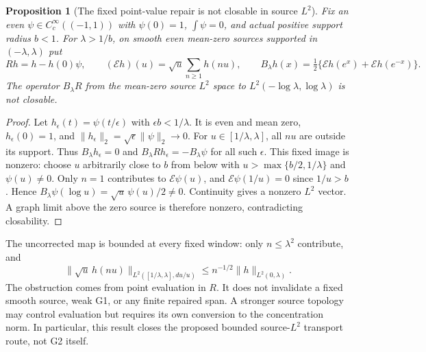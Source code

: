 \documentclass[11pt]{article}
\newtheorem{proposition}[theorem]{Proposition}
\theoremstyle{remark}
\begin{document}
\begin{proposition}[The fixed point-value repair is not closable in source $L^2$]
\label{prop:v127-nonclosable}
Fix an even $\psi\in C_c^\infty((-1,1))$ with $\psi(0)=1$,
$\int\psi=0$, and actual positive support radius $b<1$.
For $\lambda>1/b$, on smooth even mean-zero sources supported in
$(-\lambda,\lambda)$ put
\[
 Rh=h-h(0)\psi,\qquad
 (\mathcal Eh)(u)=\sqrt u\sum_{n\ge1}h(nu),\qquad
 B_\lambda h(x)=\tfrac12\{\mathcal Eh(e^x)+\mathcal Eh(e^{-x})\}.
\]
The operator $B_\lambda R$ from the mean-zero source $L^2$ space
to $L^2(-\log\lambda,\log\lambda)$ is not closable.
\end{proposition}
\begin{proof}
Let $h_\epsilon(t)=\psi(t/\epsilon)$ with $\epsilon b<1/\lambda$.
It is even and mean zero, $h_\epsilon(0)=1$, and
$\|h_\epsilon\|_2=\sqrt\epsilon\|\psi\|_2\to0$.
For $u\in[1/\lambda,\lambda]$, all $nu$ are outside its support.
Thus $B_\lambda h_\epsilon=0$ and
$B_\lambda R h_\epsilon=-B_\lambda\psi$ for all such $\epsilon$.
This fixed image is nonzero: choose $u$ arbitrarily close to $b$
from below with $u>\max\{b/2,1/\lambda\}$ and $\psi(u)\ne0$.
Only $n=1$ contributes to $\mathcal E\psi(u)$, and
$\mathcal E\psi(1/u)=0$ since $1/u>b$. Hence
$B_\lambda\psi(\log u)=\sqrt u\,\psi(u)/2\ne0$.
Continuity gives a nonzero $L^2$ vector. A graph limit above the zero
source is therefore nonzero, contradicting closability.
\end{proof}

The uncorrected map is bounded at every fixed window: only
$n\le\lambda^2$ contribute, and
\[
 \|\sqrt u\,h(nu)\|_{L^2([1/\lambda,\lambda],du/u)}
 \le n^{-1/2}\|h\|_{L^2(0,\lambda)}.
\]
The obstruction comes from point evaluation in $R$. It does not
invalidate a fixed smooth source, weak G1, or any finite repaired
span. A stronger source topology may control evaluation but requires
its own conversion to the concentration norm. In particular, this
result closes the proposed bounded source-$L^2$ transport route, not
G2 itself.
\end{document}
